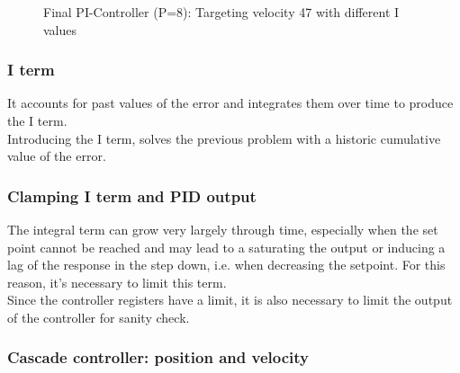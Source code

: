 \begin{figure}[H]
    \centering
{}
    \caption{Final PI-Controller (P=8): Targeting velocity 47 with different I values} \label{fig:I_final}
\end{figure}

\subsubsection*{I term}

It accounts for past values of the error and integrates them over time to produce the I term. \\
Introducing the I term, solves the previous problem with a historic cumulative value of the error.

\subsubsection*{Clamping I term and PID output}

The integral term can grow very largely through time, especially when the set point cannot be reached and may lead to a saturating the output or inducing a lag of the response in the step down, i.e. when decreasing the setpoint. For this reason, it’s necessary to limit this term.\\
Since the controller registers have a limit, it is also necessary to limit the output of the controller for sanity check. 

\subsubsection*{Cascade controller: position and velocity}

